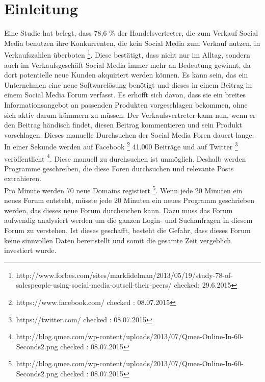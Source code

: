 
\section{Einleitung}
Eine Studie hat belegt, dass 78,6 \% der Handelsvertreter, die zum Verkauf Social Media benutzen ihre Konkurrenten, die kein Social Media zum Verkauf nutzen, in Verkaufszahlen überboten \footnote{http://www.forbes.com/sites/markfidelman/2013/05/19/study-78-of-salespeople-using-social-media-outsell-their-peers/ checked: 29.6.2015}.
Diese bestätigt, dass nicht nur im Alltag, sondern auch im Verkaufsgeschäft Social Media immer mehr an Bedeutung gewinnt, da dort potentielle neue Kunden akquiriert werden können. Es kann sein, das ein Unternehmen eine neue Softwarelösung benötigt und dieses in einem Beitrag in einem Social Media Forum verfasst. Es erhofft sich davon, dass sie ein breites Informationsangebot an passenden Produkten vorgeschlagen bekommen, ohne sich aktiv darum kümmern zu müssen. Der Verkaufsvertreter kann nun, wenn er den Beitrag händisch findet, diesen Beitrag kommentieren und sein Produkt vorschlagen. 
Dieses manuelle Durchsuchen der Social Media Foren dauert lange. In einer Sekunde werden auf Facebook \footnote{https://www.facebook.com/ checked : 08.07.2015} 41.000 Beiträge und auf Twitter \footnote{https://twitter.com/ checked : 08.07.2015} veröffentlicht  \footnote{http://blog.qmee.com/wp-content/uploads/2013/07/Qmee-Online-In-60-Seconds2.png checked : 08.07.2015}. Diese manuell zu durchsuchen ist unmöglich. Deshalb werden Programme geschreiben, die diese Foren durchsuchen und relevante Posts extrahieren.  \\ Pro Minute werden 70 neue Domains registiert \footnote{http://blog.qmee.com/wp-content/uploads/2013/07/Qmee-Online-In-60-Seconds2.png checked : 08.07.2015}. Wenn jede 20 Minuten ein neues Forum entsteht, müsste jede 20 Minuten ein neues Programm geschrieben werden, das dieses neue Forum durchsuchen kann. Dazu muss das Forum aufwendig analysiert werden um die ganzen Login- und Suchanfragen in diesem Forum zu verstehen. Ist dieses geschafft, besteht die Gefahr, dass dieses Forum keine sinnvollen Daten bereitstellt und somit die gesamte Zeit vergeblich investiert wurde.\\

